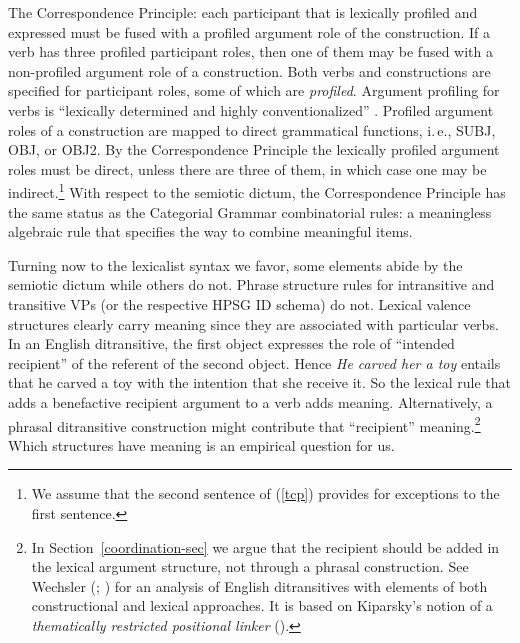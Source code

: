 \ea
The Correspondence Principle:  each participant that is lexically profiled and expressed must be
fused with a profiled argument role of the construction.  If a verb has three profiled participant
roles, then one of them may be fused with a non-profiled argument role of a construction. \citep[]{Goldberg95a}\label{tcp}
\z
Both verbs and constructions are specified for participant roles, some of which are \emph{profiled}.
Argument profiling for verbs is ``lexically determined and highly conventionalized''
\citep[]{Goldberg95a}.  Profiled argument roles of a construction are mapped to direct
grammatical functions, i.\,e., SUBJ, OBJ, or OBJ2.  By the Correspondence Principle the lexically profiled argument
roles must be direct, unless there are three of them, in which case one may be indirect.\footnote{%
  We assume that the second sentence of (\ref{tcp}) provides for exceptions to the first sentence.}
With respect to the semiotic dictum, the Correspondence Principle has the same status as the
Categorial Grammar combinatorial rules: a meaningless algebraic rule that specifies the way to
combine meaningful items.   

\largerpage
Turning now to the lexicalist syntax we favor, some elements abide by the semiotic dictum while
others do not.  Phrase structure rules for intransitive and transitive VPs (or the respective HPSG ID schema)
do not.  Lexical valence structures clearly carry meaning since they are associated with particular
verbs.  In an English ditransitive, the first object expresses the role of ``intended recipient'' of
the referent of the second object.
Hence \emph{He carved her a toy} entails that he carved a toy with the intention that she receive
it.  So the lexical rule that adds a benefactive recipient argument to a verb adds meaning.  Alternatively, a phrasal ditransitive construction might
contribute that ``recipient'' meaning.\footnote{%
In Section~\ref{coordination-sec} we argue that the
  recipient should be added in the lexical argument structure, not through a phrasal construction.
  See Wechsler (\citeyear[--113]{Wechsler91a-u}; \citeyear[--89]{Wechsler95a-u}) for an
  analysis of English ditransitives with elements of both constructional and lexical approaches.  It
  is based on Kiparsky's notion of a \emph{thematically
    restricted positional linker} (\citeyear{Kiparsky87a-u, Kiparsky88a-u}).}  Which structures have
meaning is an empirical question for us. 



